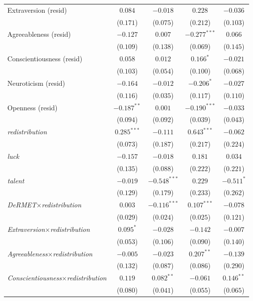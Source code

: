 \begin{footnotesize}
\begin{longtable}{l cc cc}
Extraversion (resid) & $0.084$ & $-0.018$ & $0.228$ & $-0.036$ \\
    & ($0.171$) & ($0.075$) & ($0.212$) & ($0.103$) \\
Agreeableness (resid) & $-0.127$ & $0.007$ & $-0.277^{***}$ & $0.066$ \\
    & ($0.109$) & ($0.138$) & ($0.069$) & ($0.145$) \\
Conscientiousness (resid) & $0.058$ & $0.012$ & $0.166^{*}$ & $-0.021$ \\
    & ($0.103$) & ($0.054$) & ($0.100$) & ($0.068$) \\
Neuroticism (resid) & $-0.164$ & $-0.012$ & $-0.206^{*}$ & $-0.027$ \\
    & ($0.116$) & ($0.035$) & ($0.117$) & ($0.110$) \\
Openness (resid) & $-0.187^{**}$ & $0.001$ & $-0.190^{***}$ & $-0.033$ \\
    & ($0.094$) & ($0.092$) & ($0.039$) & ($0.043$) \\
\textit{redistribution} & $0.285^{***}$ & $-0.111$ & $0.643^{***}$ & $-0.062$ \\
    & ($0.073$) & ($0.187$) & ($0.217$) & ($0.224$) \\
\textit{luck} & $-0.157$ & $-0.018$ & $0.181$ & $0.034$ \\
    & ($0.135$) & ($0.088$) & ($0.222$) & ($0.221$) \\
\textit{talent} & $-0.019$ & $-0.548^{***}$ & $0.229$ & $-0.511^{*}$ \\
    & ($0.129$) & ($0.179$) & ($0.233$) & ($0.262$) \\
\textit{DeRMET}$\times$\textit{redistribution} & $0.003$ & $-0.116^{***}$ & $0.107^{***}$ & $-0.078$ \\
    & ($0.029$) & ($0.024$) & ($0.025$) & ($0.121$) \\
\textit{Extraversion}$\times$\textit{redistribution} & $0.095^{*}$ & $-0.028$ & $-0.142$ & $-0.007$ \\
    & ($0.053$) & ($0.106$) & ($0.090$) & ($0.140$) \\
\textit{Agreeableness}$\times$\textit{redistribution} & $-0.005$ & $-0.023$ & $0.207^{**}$ & $-0.139$ \\
    & ($0.132$) & ($0.087$) & ($0.086$) & ($0.290$) \\
\textit{Conscientiousness}$\times$\textit{redistribution} & $0.119$ & $0.082^{**}$ & $-0.061$ & $0.146^{**}$ \\
    & ($0.080$) & ($0.041$) & ($0.055$) & ($0.065$) \\

\end{longtable}
\end{footnotesize}
